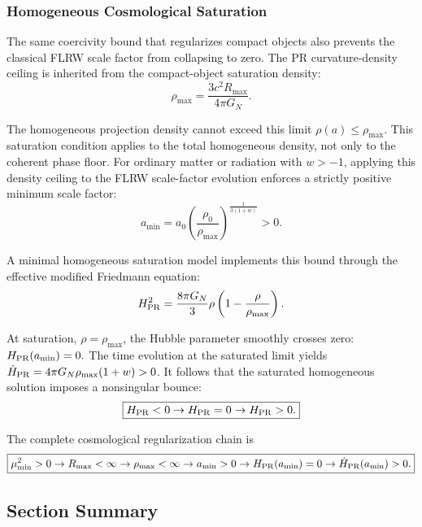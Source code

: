 \documentclass[11pt]{article}
\begin{document}
\subsubsection{Homogeneous Cosmological Saturation}
The same coercivity bound that regularizes compact objects also prevents the classical FLRW scale factor from collapsing to zero. The PR curvature-density ceiling is inherited from the compact-object saturation density:
\begin{equation}
\rho_{\max}
=
\frac{3c^2R_{\max}}{4\pi G_N}.
\end{equation}

The homogeneous projection density cannot exceed this limit $\rho(a)\leq\rho_{\max}.$ This saturation condition applies to the total homogeneous density, not only to the coherent phase floor. For ordinary matter or radiation with \(w>-1\), applying this density ceiling to the FLRW scale-factor evolution enforces a strictly positive minimum scale factor:
\begin{equation}
a_{\min}
=
a_0
\left(
\frac{\rho_0}{\rho_{\max}}
\right)^{\frac{1}{3(1+w)}}
>
0.
\end{equation}

A minimal homogeneous saturation model implements this bound through the effective modified Friedmann equation:
\begin{equation}
H_{\rm PR}^2
=
\frac{8\pi G_N}{3}
\rho
\left(
1-\frac{\rho}{\rho_{\max}}
\right).
\end{equation}

At saturation, \(\rho=\rho_{\max}\), the Hubble parameter smoothly crosses zero: $H_{\rm PR}(a_{\min})=0.$
The time evolution at the saturated limit yields $\dot H_{\rm PR} = 4\pi G_N\rho_{\max}(1+w) >0$. It follows that the saturated homogeneous solution imposes a nonsingular bounce:
\begin{equation}
\boxed{
H_{\rm PR}<0
\rightarrow
H_{\rm PR}=0
\rightarrow
H_{\rm PR}>0.
}
\end{equation}

The complete cosmological regularization chain is
\begin{equation}
\boxed{
\mu_{\min}^2>0
\rightarrow
R_{\max}<\infty
\rightarrow
\rho_{\max}<\infty
\rightarrow
a_{\min}>0
\rightarrow
H_{\rm PR}(a_{\min})=0
\rightarrow
\dot H_{\rm PR}(a_{\min})>0.
}
\end{equation}

\subsection{Section Summary}
\label{sec:observational_summary}
\end{document}
